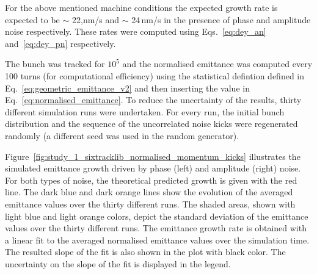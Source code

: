 For the above mentioned machine conditions the expected growth rate is expected to be $\sim$ 22,nm/s and $\sim$ 24\,nm/s in the presence of phase and amplitude noise respectively. These rates were computed using Eqs.~\eqref{eq:dey_an} and~\ref{eq:dey_pn} respectively.


The bunch was tracked for $10^5$ and the normalised emittance was computed every 100 turns (for computational efficiency) using the statistical defintion defined in Eq.~\eqref{eq:geometric_emittance_v2} and then inserting the value in Eq.~\eqref{eq:normalised_emittance}. To reduce the uncertainty of the results, thirty different simulation runs were undertaken. For every run, the initial bunch distribution and the sequence of the uncorrelated noise kicks were regenerated randomly (a different seed was used in the random generator). 

Figure~\ref{fig:study_1_sixtracklib_normalised_momentum_kicks} illustrates the simulated emittance growth driven by phase (left) and amplitude (right) noise. For both types of noise, the theoretical predicted growth is given with the red line. The dark blue and dark orange lines show the evolution of the averaged emittance values over the thirty different runs. The shaded areas, shown with light blue and light orange colors, depict the standard deviation of the emittance values over the thirty different runs. The emittance growth rate is obtained with a linear fit to the averaged normalised emittance values over the simulation time. The resulted slope of the fit is also shown in the plot with black color. The uncertainty on the slope of the fit is displayed in the legend.

